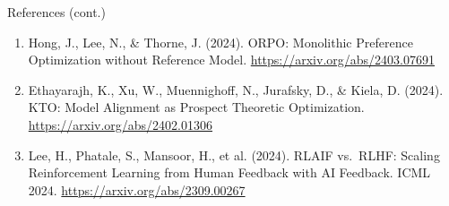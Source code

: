 \begin{frame}[allowframebreaks]{References (cont.)}
\begin{enumerate}
    \item Hong, J., Lee, N., \& Thorne, J. (2024). ORPO: Monolithic Preference Optimization without Reference Model. \href{https://arxiv.org/abs/2403.07691}{https://arxiv.org/abs/2403.07691}
    \item Ethayarajh, K., Xu, W., Muennighoff, N., Jurafsky, D., \& Kiela, D. (2024). KTO: Model Alignment as Prospect Theoretic Optimization. \href{https://arxiv.org/abs/2402.01306}{https://arxiv.org/abs/2402.01306}
    \item Lee, H., Phatale, S., Mansoor, H., et al. (2024). RLAIF vs.\ RLHF: Scaling Reinforcement Learning from Human Feedback with AI Feedback. ICML 2024. \href{https://arxiv.org/abs/2309.00267}{https://arxiv.org/abs/2309.00267}
  \end{enumerate}
\end{frame}
